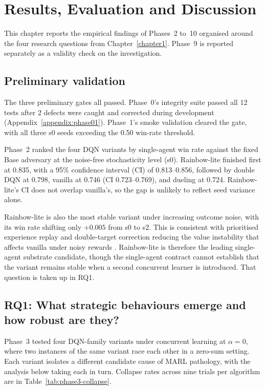 \chapter{Results, Evaluation and Discussion}
\label{chapter4}

This chapter reports the empirical findings of Phases~2 to~10 organised around the four research questions from Chapter~\ref{chapter1}. Phase~9 is reported separately as a validity check on the investigation.

\section{Preliminary validation}
\label{sec:prelim}

The three preliminary gates all passed. Phase~0's integrity suite passed all 12 tests after 2 defects were caught and corrected during development (Appendix~\ref{appendix:phase01}). Phase~1's smoke validation cleared the gate, with all three s0 seeds exceeding the 0.50 win-rate threshold.

Phase~2 ranked the four DQN variants by single-agent win rate against the fixed Base adversary at the noise-free stochasticity level (s0). Rainbow-lite finished first at 0.835, with a 95\% confidence interval (CI) of 0.813--0.856, followed by double DQN at 0.798, vanilla at 0.746 (CI 0.723--0.769), and dueling at 0.724. Rainbow-lite's CI does not overlap vanilla's, so the gap is unlikely to reflect seed variance alone.

Rainbow-lite is also the most stable variant under increasing outcome noise, with its win rate shifting only $+0.005$ from s0 to s2. This is consistent with prioritised experience replay and double-target correction reducing the value instability that affects vanilla under noisy rewards \citep{schaul2016prioritized,vanhasselt2016double}. Rainbow-lite is therefore the leading single-agent substrate candidate, though the single-agent contract cannot establish that the variant remains stable when a second concurrent learner is introduced. That question is taken up in RQ1.

\section{RQ1: What strategic behaviours emerge and how robust are they?}
\label{sec:rq1}

Phase~3 tested four DQN-family variants under concurrent learning at $\alpha = 0$, where two instances of the same variant race each other in a zero-sum setting. Each variant isolates a different candidate cause of MARL pathology, with the analysis below taking each in turn. Collapse rates across nine trials per algorithm are in Table~\ref{tab:phase3-collapse}.

